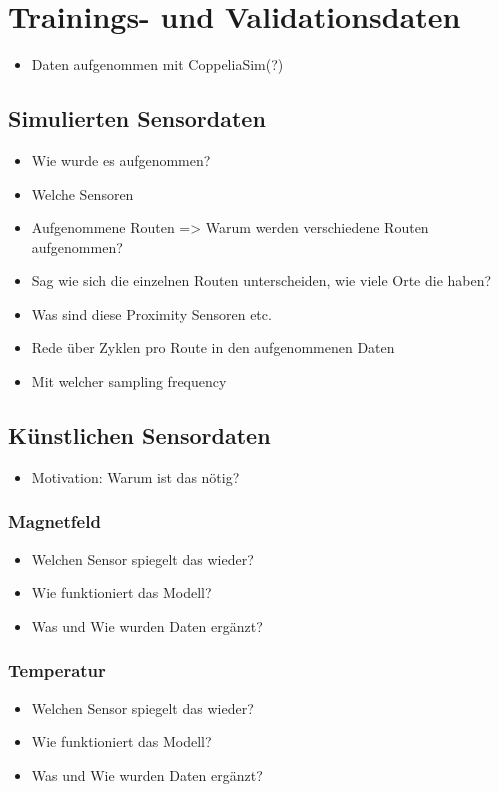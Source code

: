 \chapter{Trainings- und Validationsdaten}
\begin{itemize}
    \item Daten aufgenommen mit CoppeliaSim(?)
\end{itemize}

\section{Simulierten Sensordaten}
\begin{itemize}
    \item Wie wurde es aufgenommen?
    \item Welche Sensoren
    \item Aufgenommene Routen => Warum werden verschiedene Routen aufgenommen?
    \item Sag wie sich die einzelnen Routen unterscheiden, wie viele Orte die haben?
    \item Was sind diese Proximity Sensoren etc.
    \item Rede über Zyklen pro Route in den aufgenommenen Daten
    \item Mit welcher sampling frequency
\end{itemize}

\section{Künstlichen Sensordaten}
\begin{itemize}
    \item Motivation: Warum ist das nötig?
\end{itemize}

\subsection{Magnetfeld}
\begin{itemize}
    \item Welchen Sensor spiegelt das wieder?
    \item Wie funktioniert das Modell?
    \item Was und Wie wurden Daten ergänzt?
\end{itemize}

\subsection{Temperatur}
\begin{itemize}
    \item Welchen Sensor spiegelt das wieder?
    \item Wie funktioniert das Modell?
    \item Was und Wie wurden Daten ergänzt?
\end{itemize}

